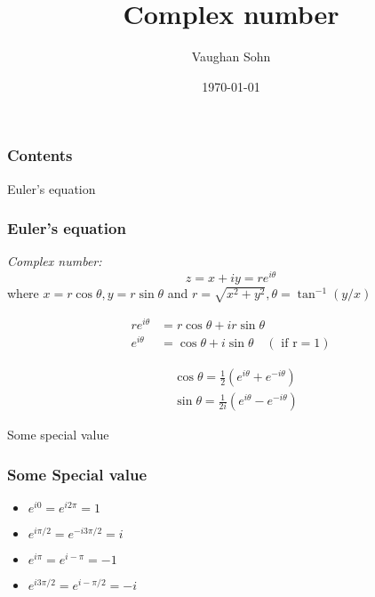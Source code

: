 \documentclass[9pt]{beamer}
\title{Complex number}
\date{\today}
\author{Vaughan Sohn}
\begin{document}
    \maketitle
    
    \begin{frame}
        \frametitle{Contents}
        \tableofcontents
    \end{frame}

    \begin{section}{Euler's equation}
        \begin{frame}
            \frametitle{Euler's equation}
            \textit{Complex number:}
            $$ z = x + iy = re^{i \theta}$$
            where $x = r\cos \theta, y= r\sin \theta$ and $r = \sqrt{x^2 + y^2}, \theta = \tan^{-1}(y/x)$
            \vspace{0.2cm}
            \begin{theorem}
                $$
                \begin{aligned}
                r e^{i \theta} & =r \cos \theta+i r \sin \theta \\
                e^{i \theta} & =\cos \theta+i \sin \theta \quad(\text { if } \mathrm{r}=1)
                \end{aligned}
                $$
            \end{theorem}
            \begin{theorem}
                $$
                \begin{aligned}
                & \cos \theta =\frac{1}{2}\left(e^{i \theta }+e^{-i \theta }\right) \\
                & \sin \theta =\frac{1}{2 i}\left(e^{i \theta }-e^{-i \theta }\right)
                \end{aligned}
                $$
            \end{theorem}
        \end{frame}

    \end{section}

    \begin{section}{Some special value}
        \begin{frame}
            \frametitle{Some Special value}
            \begin{itemize}
                \item $e^{i0} = e^{i2\pi} = 1$
                \item $e^{i\pi/2} = e^{-i 3\pi/2} = i$
                \item $e^{i \pi} = e^{i -\pi} = -1$
                \item $e^{i 3\pi/2} = e^{i -\pi/2} = -i$
            \end{itemize}
            
        \end{frame}

    \end{section}
\end{document}

